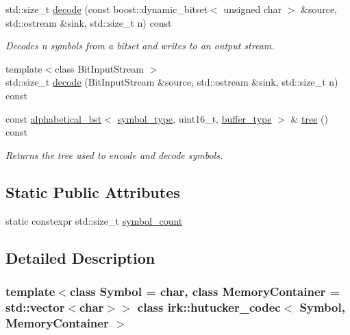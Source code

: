 \begin{DoxyCompactItemize}
\item 
std\+::size\+\_\+t \mbox{\hyperlink{classirk_1_1hutucker__codec_a4c5bc826a54ecf8cc9ce94b61396370f}{decode}} (const boost\+::dynamic\+\_\+bitset$<$ unsigned char $>$ \&source, std\+::ostream \&sink, std\+::size\+\_\+t n) const
\begin{DoxyCompactList}\small\item\em Decodes {\ttfamily n} symbols from a bitset and writes to an output stream. \end{DoxyCompactList}\item 
{\footnotesize template$<$class Bit\+Input\+Stream $>$ }\\std\+::size\+\_\+t \mbox{\hyperlink{classirk_1_1hutucker__codec_a49ca7c3ce227aada3ed65afb3a8444ec}{decode}} (Bit\+Input\+Stream \&source, std\+::ostream \&sink, std\+::size\+\_\+t n) const
\item 
const \mbox{\hyperlink{classirk_1_1alphabetical__bst}{alphabetical\+\_\+bst}}$<$ \mbox{\hyperlink{classirk_1_1hutucker__codec_af23dee5959ae2a69eea0ab324cf6ecb6}{symbol\+\_\+type}}, uint16\+\_\+t, \mbox{\hyperlink{classirk_1_1hutucker__codec_a995378c8c253dae9867a4b1762eeaf95}{buffer\+\_\+type}} $>$ \& \mbox{\hyperlink{classirk_1_1hutucker__codec_a68886f66b539effd689bd54ccf591db1}{tree}} () const
\begin{DoxyCompactList}\small\item\em Returns the tree used to encode and decode symbols. \end{DoxyCompactList}\end{DoxyCompactItemize}
\subsection*{Static Public Attributes}
\begin{DoxyCompactItemize}
\item 
static constexpr std\+::size\+\_\+t \mbox{\hyperlink{classirk_1_1hutucker__codec_a4b583dcfd72280bb0178cd8cf2845e34}{symbol\+\_\+count}}
\end{DoxyCompactItemize}


\subsection{Detailed Description}
\subsubsection*{template$<$class Symbol = char, class Memory\+Container = std\+::vector$<$char$>$$>$\newline
class irk\+::hutucker\+\_\+codec$<$ Symbol, Memory\+Container $>$}

